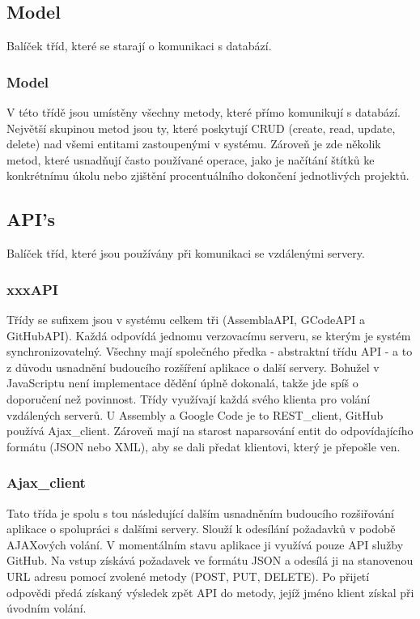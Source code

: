 \subsection{Model}

Balíček tříd, které se starají o komunikaci s databází.

\subsubsection{Model}

V této třídě jsou umístěny všechny metody, které přímo komunikují s databází. Největší skupinou metod jsou ty, které poskytují CRUD (create, read, update, delete) nad všemi entitami zastoupenými v systému. Zároveň je zde několik metod, které usnadňují často používané operace, jako je načítání štítků ke konkrétnímu úkolu nebo zjištění procentuálního dokončení jednotlivých projektů.

\subsection{API's}

Balíček tříd, které jsou používány při komunikaci se vzdálenými servery.

\subsubsection{xxxAPI}

Třídy se sufixem  jsou v systému celkem tři (AssemblaAPI, GCodeAPI a GitHubAPI). Každá odpovídá jednomu verzovacímu serveru, se kterým je systém synchronizovatelný. Všechny mají společného předka - abstraktní třídu API - a to z důvodu usnadnění budoucího rozšíření aplikace o další servery. Bohužel v JavaScriptu není implementace dědění úplně dokonalá, takže jde spíš o doporučení než povinnost. Třídy využívají každá svého klienta pro volání vzdálených serverů. U Assembly a Google Code je to REST\_client, GitHub používá Ajax\_client. Zároveň mají na starost naparsování entit do odpovídajícího formátu (JSON nebo XML), aby se dali předat klientovi, který je přepošle ven.

\subsubsection{Ajax\_client}

Tato třída je spolu s tou následující dalším usnadněním budoucího rozšiřování aplikace o spolupráci s dalšími servery. Slouží k odesílání požadavků v podobě AJAXových volání. V momentálním stavu aplikace ji využívá pouze API služby GitHub. Na vstup získává požadavek ve formátu JSON a odesílá ji na stanovenou URL adresu pomocí zvolené metody (POST, PUT, DELETE). Po přijetí odpovědi předá získaný výsledek zpět API do metody, jejíž jméno klient získal při úvodním volání.

